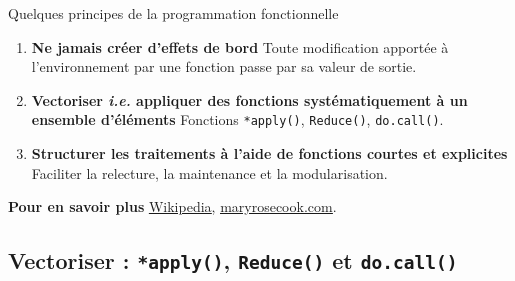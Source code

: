 \documentclass[12pt,ignorenonframetext,handout,]{beamer}
\providecommand{\tightlist}{%
  \setlength{\itemsep}{0pt}\setlength{\parskip}{0pt}}
\newcommand{\intertitre}[1]{\textcolor{redInsee}{\textbf{#1}}}
\begin{document}
\begin{frame}[fragile]{Quelques principes de la programmation
fonctionnelle}
\protect\hypertarget{quelques-principes-de-la-programmation-fonctionnelle}{}

\vfill

\begin{enumerate}
[1.]
\tightlist
\item
  \textbf{Ne jamais créer d’effets de bord} Toute modification apportée
  à l’environnement par une fonction passe par sa valeur de sortie.
\end{enumerate}

\vfill

\begin{enumerate}
[1.]
\setcounter{enumi}{1}
\tightlist
\item
  \pause \textbf{Vectoriser \textit{i.e.} appliquer des fonctions systématiquement à un ensemble d'éléments}
  Fonctions \texttt{*apply()}, \texttt{Reduce()}, \texttt{do.call()}.
\end{enumerate}

\vfill

\begin{enumerate}
[1.]
\setcounter{enumi}{2}
\tightlist
\item
  \pause \textbf{Structurer les traitements à l'aide de fonctions courtes et explicites}
  Faciliter la relecture, la maintenance et la modularisation.
\end{enumerate}

\vfill

\pause \intertitre{Pour en savoir plus}
\href{https://en.wikipedia.org/wiki/FP_(programming_language)}{\underline{Wikipedia}},
\href{https://maryrosecook.com/blog/post/a-practical-introduction-to-functional-programming}{\underline{maryrosecook.com}}.

\vfill

\end{frame}

\hypertarget{vectoriser-apply-reduce-et-do.call}{%
\subsection{\texorpdfstring{Vectoriser : \texttt{*apply()},
\texttt{Reduce()} et
\texttt{do.call()}}{Vectoriser : *apply(), Reduce() et do.call()}}\label{vectoriser-apply-reduce-et-do.call}}
\end{document}
